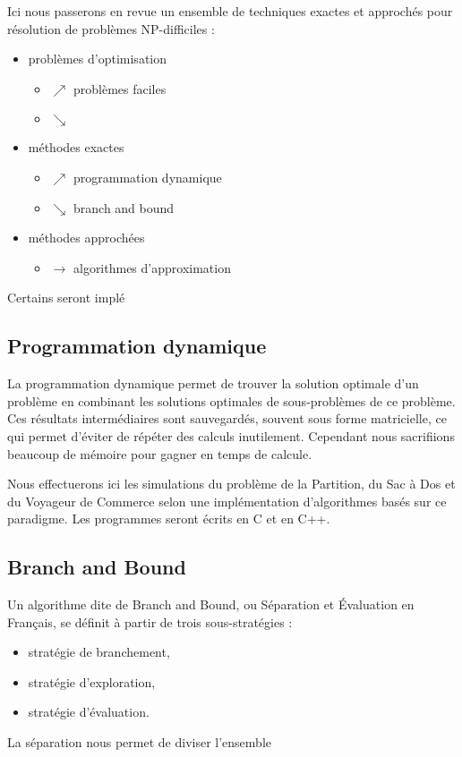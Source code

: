 Ici nous passerons en revue un ensemble de techniques exactes et approchés pour 
résolution de problèmes NP-difficiles :

\begin{itemize}
  \item problèmes d'optimisation 
  \begin{itemize}
    \item[] $\nearrow$ problèmes faciles
    \item[] $\searrow$ 
  \end{itemize}
	\item méthodes exactes 
	\begin{itemize}
		\item[] $\nearrow$ programmation dynamique
		\item[] $\searrow$ branch and bound
	\end{itemize}
	\item méthodes approchées
	\begin{itemize}
		\item[] $\longrightarrow$ algorithmes d'approximation
	\end{itemize}
\end{itemize}

Certains seront implé

\subsection{Programmation dynamique}
La programmation dynamique permet de trouver la solution optimale d'un
problème en combinant les solutions optimales de sous-problèmes de ce
problème. Ces résultats intermédiaires sont sauvegardés, souvent sous
forme matricielle, ce qui permet d'éviter de répéter des calculs inutilement.
Cependant nous sacrifiions beaucoup de mémoire pour gagner en temps de calcule.

Nous effectuerons ici les simulations du problème de la Partition, du Sac
à Dos et du Voyageur de Commerce selon une implémentation
d'algorithmes basés sur ce paradigme. Les programmes
seront écrits en C et en C++.

\subsection{Branch and Bound}
Un algorithme dite de Branch and Bound, ou Séparation et Évaluation en Français, se définit à partir de trois sous-stratégies :
\begin{itemize}
\item stratégie de branchement,
\item stratégie d'exploration,
\item stratégie d'évaluation.
\end{itemize}
La séparation nous permet de diviser l'ensemble 

